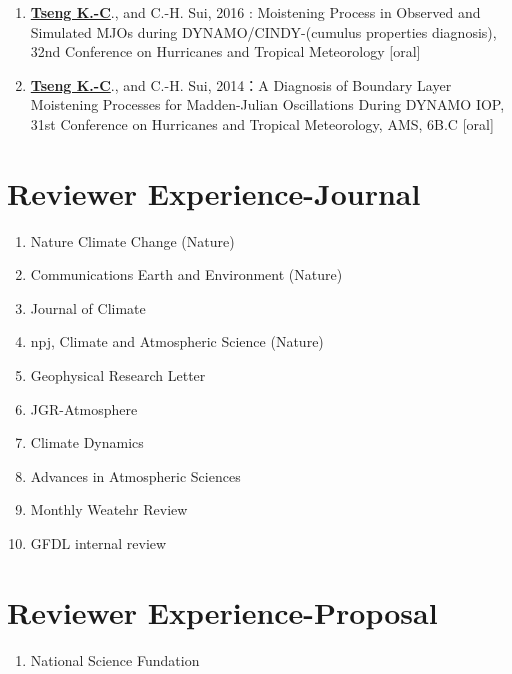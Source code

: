\documentclass{article}
\begin{document}
\begin{enumerate}
	\item \normalsize{\bf{\underline{Tseng K.-C}}}., and C.-H. Sui, 2016 : Moistening Process in Observed and Simulated MJOs during DYNAMO/CINDY-(cumulus properties diagnosis), 32nd Conference on Hurricanes and Tropical Meteorology [oral] 
	\item \normalsize{\bf{\underline{Tseng K.-C}}}., and C.-H. Sui, 2014：A Diagnosis of Boundary Layer Moistening Processes for Madden-Julian Oscillations During DYNAMO IOP, 31st Conference on Hurricanes and Tropical Meteorology, AMS, 6B.C [oral] 
    \end{enumerate}


\section{\color{airforceblue}Reviewer Experience-Journal}
\begin{enumerate}
	\item Nature Climate Change (Nature)
	\item Communications Earth and Environment (Nature)
	\item Journal of Climate 
	\item npj, Climate and Atmospheric Science (Nature)
	\item Geophysical Research Letter
	\item JGR-Atmosphere
	\item Climate Dynamics
	\item Advances in Atmospheric Sciences
	\item Monthly Weatehr Review
	\item GFDL internal review
\end{enumerate}
\section{\color{airforceblue}Reviewer Experience-Proposal}
\begin{enumerate}
	\item National Science Fundation
\end{enumerate}
\end{document}
